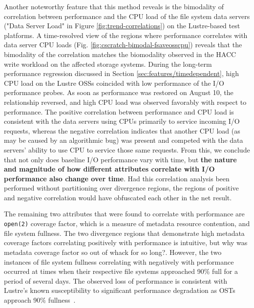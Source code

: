 
Another noteworthy feature that this method reveals is the bimodality of correlation between performance and the CPU load of the file system data servers ("Data Server Load" in Figure \ref{fig:trend-correlations}) on the Lustre-based test platforms.
A time-resolved view of the regions where performance correlates with data server CPU loads (Fig. \ref{fig:cscratch-bimodal-fsaveosscpu}) reveals that the bimodality of the correlation matches the biomodality observed in the HACC write workload on the affected storage systems.
During the long-term performance regression discussed in Section \ref{sec:features/timedependent}, high CPU load on the Lustre OSSs coincided with low performance of the I/O performance probes.
As soon as performance was restored on August 10, the relationship reversed, and high CPU load was observed favorably with respect to performance.
The positive correlation between performance and CPU load is consistent with the data servers using CPUs primarily to service incoming I/O requests, whereas the negative correlation indicates that another CPU load (as may be caused by an algorithmic bug) was present and competed with the data servers' ability to use CPU to service those same requests.
From this, we conclude that not only does baseline I/O performance vary with time, but \textbf{the nature and magnitude of how different attributes correlate with I/O performance also change over time}.
Had this correlation analysis been performed without partitioning over divergence regions, the regions of positive and negative correlation would have obfuscated each other in the net result.

The remaining two attributes that were found to correlate with performance are \texttt{open(2)} coverage factor, which is a measure of metadata resource contention, and file system fullness.
The two divergence regions that demonstrate high metadata coverage factors correlating positively with performance is intuitive, {\color{red}but why was metadata coverage factor so out of whack for so long?}.
However, the two instances of file system fullness correlating with negatively with performance occurred at times when their respective file systems approached 90\% full for a period of several days.
The observed loss of performance is consistent with Lustre's known susceptibility to significant performance degradation as OSTs approach 90\% fullness~\cite{oral2014best,Lockwood2017}.

